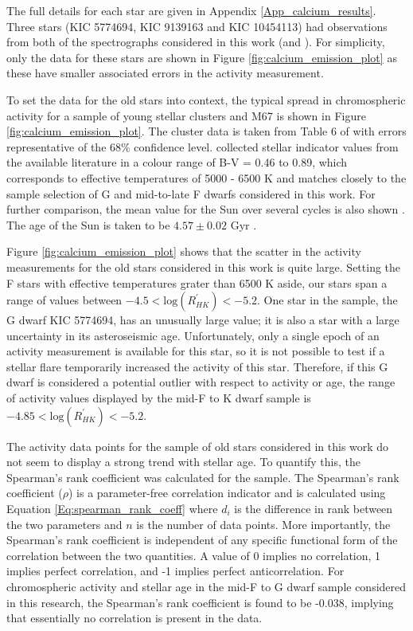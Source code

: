 The full details for each star are given in Appendix \ref{App_calcium_results}. Three stars (KIC 5774694, KIC 9139163 and KIC 10454113) had observations from both of the spectrographs considered in this work (\esp and \narval). For simplicity, only the \narval data for these stars are shown in Figure \ref{fig:calcium_emission_plot} as these have smaller associated errors in the activity measurement. 

To set the data for the old stars into context, the typical spread in chromospheric activity for a sample of young stellar clusters and M67 is shown in Figure \ref{fig:calcium_emission_plot}. The cluster data is taken from Table 6 of \citet{Mamajek_Hillenbrand_2008} with errors representative of the 68\% confidence level. \citet{Mamajek_Hillenbrand_2008} collected stellar \Rprime indicator values from the available literature in a colour range of B-V = 0.46 to 0.89, which corresponds to effective temperatures of 5000 - 6500 K and matches closely to the sample selection of G and mid-to-late F dwarfs considered in this work. For further comparison, the mean \Rprime value for the Sun over several cycles is also shown \citep{Egeland_etal_2017}. The age of the Sun is taken to be $4.57 \pm 0.02$ Gyr \citep{Bahcall_etal_1995}.

Figure \ref{fig:calcium_emission_plot} shows that the scatter in the \Rprime activity measurements for the old stars considered in this work is quite large. Setting the F stars with effective temperatures grater than 6500 K aside, our stars span a range of \Rprime values between $-4.5<\mathrm{log}(R^{'}_{HK})<-5.2$. One star in the sample, the G dwarf KIC 5774694, has an unusually large \Rprime value; it is also a star with a large uncertainty in its asteroseismic age. Unfortunately, only a single epoch of an activity measurement is available for this star, so it is not possible to test if a stellar flare temporarily increased the activity of this star. Therefore, if this G dwarf is considered a potential outlier with respect to activity or age, the range of activity values displayed by the mid-F to K dwarf sample is $-4.85<\mathrm{log}(R^{'}_{HK})<-5.2$.

The activity data points for the sample of old stars considered in this work do not seem to display a strong trend with stellar age. To quantify this, the Spearman's rank coefficient was calculated for the sample. The Spearman's rank coefficient ($\rho$) is a parameter-free correlation indicator and is calculated using Equation \ref{Eq:spearman_rank_coeff} where $d_{i}$ is the difference in rank between the two parameters and $n$ is the number of data points. More importantly, the Spearman's rank coefficient is independent of any specific functional form of the correlation between the two quantities. A value of 0 implies no correlation, 1 implies perfect correlation, and -1 implies perfect anticorrelation. For chromospheric activity and stellar age in the mid-F to G dwarf sample considered in this research, the Spearman's rank coefficient is found to be -$0.038$, implying that essentially no correlation is present in the data.

